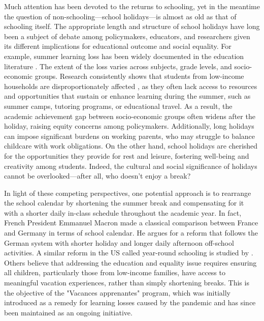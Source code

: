 \documentclass[12pt]{article}
\begin{document}
Much attention has been devoted to the returns to schooling, yet in the
meantime the question of non-schooling—school holidays—is almost as old as that
of schooling itself. The appropriate length and structure of school holidays
have long been a subject of debate among policymakers, educators, and
researchers given its different implications for educational outcome and social
equality. For example, summer learning loss has been widely documented in the
education literature \citep{cooper1996effects}.
The extent of the loss varies across subjects, grade levels, and socio-economic
groups. Research consistently shows that students from low-income households
are disproportionately affected \citep{morgan2019socio}, as they often lack
access to resources and opportunities that sustain or enhance learning during
the summer, such as summer camps, tutoring programs, or educational travel. As
a result, the academic achievement gap between socio-economic groups often
widens after the holiday, raising equity concerns among policymakers.
Additionally, long holidays can impose significant burdens on working parents,
who may struggle to balance childcare with work obligations. On the other hand,
school holidays are cherished for the opportunities they provide for rest and
leisure, fostering well-being and creativity among students. Indeed, the
cultural and social significance of holidays cannot be overlooked—after all,
who doesn't enjoy a break?

In light of these competing perspectives, one potential approach is to
rearrange the school calendar by shortening the summer break and compensating
for it with a shorter daily in-class schedule throughout the academic year. In
fact, French President Emmanuel Macron made a classical comparison between
France and Germany in terms of school calendar. He argues for a reform that
follows the German system with shorter holiday and longer daily afternoon
off-school activities. A similar reform in the US called year-round schooling
is studied by \citet{mcmullen2012impact}. Others believe that addressing the
education and equality issue requires ensuring all children, particularly those
from low-income families, have access to meaningful vacation experiences,
rather than simply shortening breaks. This is the objective of the "Vacances
apprenantes" program, which was initially introduced as a remedy for learning
losses caused by the pandemic and has since been maintained as an ongoing
initiative.
\end{document}

